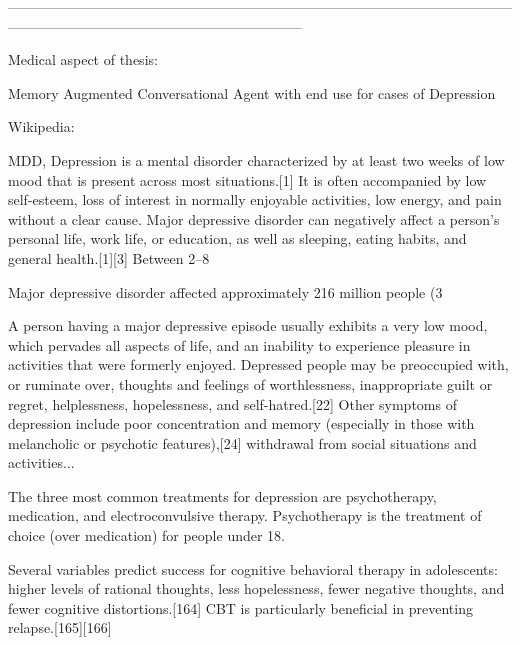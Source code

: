 ---------------------------------------------------------------------------------------------------------------------------------------------------------------------------











Medical aspect of thesis:

Memory Augmented Conversational Agent with end use for cases of Depression

Wikipedia:

MDD, Depression is a mental disorder characterized by at least two weeks of low mood that is present across most situations.[1] It is often accompanied by low self-esteem, loss of interest in normally enjoyable activities, low energy, and pain without a clear cause. Major depressive disorder can negatively affect a person's personal life, work life, or education, as well as sleeping, eating habits, and general health.[1][3] Between 2–8%

Major depressive disorder affected approximately 216 million people (3%

A person having a major depressive episode usually exhibits a very low mood, which pervades all aspects of life, and an inability to experience pleasure in activities that were formerly enjoyed. Depressed people may be preoccupied with, or ruminate over, thoughts and feelings of worthlessness, inappropriate guilt or regret, helplessness, hopelessness, and self-hatred.[22] Other symptoms of depression include poor concentration and memory (especially in those with melancholic or psychotic features),[24] withdrawal from social situations and activities...

The three most common treatments for depression are psychotherapy, medication, and electroconvulsive therapy. Psychotherapy is the treatment of choice (over medication) for people under 18.

Several variables predict success for cognitive behavioral therapy in adolescents: higher levels of rational thoughts, less hopelessness, fewer negative thoughts, and fewer cognitive distortions.[164] CBT is particularly beneficial in preventing relapse.[165][166]



